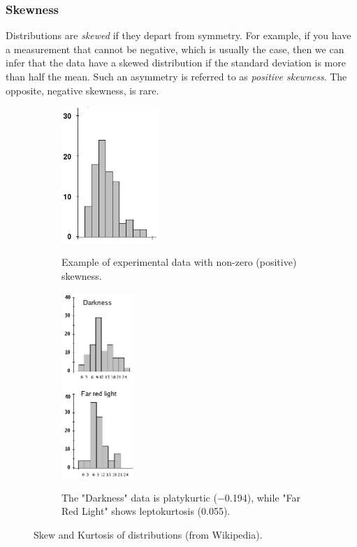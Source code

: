 \subsubsection{Skewness}

Distributions are \emph{skewed} if they depart from symmetry. For example, if you have a measurement that cannot be negative, which is usually the case, then we can infer that the data have a skewed distribution if the standard deviation is more than half the mean. Such an asymmetry is referred to as \emph{positive skewness}. The opposite, negative skewness, is rare.


\begin{figure}
\centering
\begin{subfigure}{.5\textwidth}
  \centering
  \includegraphics[width=0.4\textwidth]{../Images/SkewedDistribution.png}\\
  \caption{Example of experimental data with non-zero (positive) skewness.}
  \label{fig:skewness}
  \end{subfigure}%
\begin{subfigure}{.5\textwidth}
  \centering
\includegraphics[width=0.3\textwidth]{../Images/KurtosisChanges.png}\\
  \caption{The "Darkness" data is platykurtic (−0.194), while "Far Red Light" shows leptokurtosis (0.055).}
  \label{fig:kurtosis}
  \end{subfigure}
\caption{Skew and Kurtosis of distributions (from Wikipedia).}
\label{fig:skewkurtosis}
\end{figure}


